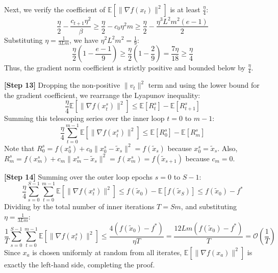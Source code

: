 \documentclass[11pt]{article}
\begin{document}
Next, we verify the coefficient of $\mathbb{E}[\|\nabla f(x_t)\|^2]$ is at least $\frac{\eta}{4}$:
\begin{equation*}
    \frac{\eta}{2} - \frac{c_{t+1}\eta^2}{\beta} \ge \frac{\eta}{2} - c_0 \eta^2 m \ge \frac{\eta}{2} - \frac{\eta^3 L^2 m^2 (e-1)}{2}
\end{equation*}
Substituting $\eta = \frac{1}{3Lm}$, we have $\eta^2 L^2 m^2 = \frac{1}{9}$:
\begin{equation*}
    \frac{\eta}{2} \left( 1 - \frac{e-1}{9} \right) \ge \frac{\eta}{2} \left( 1 - \frac{2}{9} \right) = \frac{7\eta}{18} \ge \frac{\eta}{4}
\end{equation*}
Thus, the gradient norm coefficient is strictly positive and bounded below by $\frac{\eta}{4}$.

\textbf{[Step 13]} Dropping the non-positive $\|v_t\|^2$ term and using the lower bound for the gradient coefficient, we rearrange the Lyapunov inequality:
\begin{equation} \tag{Step 13}
    \frac{\eta}{4} \mathbb{E}[\|\nabla f(x_t^s)\|^2] \le \mathbb{E}[R_t^s] - \mathbb{E}[R_{t+1}^s]
\end{equation}
Summing this telescoping series over the inner loop $t = 0$ to $m-1$:
\begin{equation*}
    \frac{\eta}{4} \sum_{t=0}^{m-1} \mathbb{E}[\|\nabla f(x_t^s)\|^2] \le \mathbb{E}[R_0^s] - \mathbb{E}[R_m^s]
\end{equation*}
Note that $R_0^s = f(x_0^s) + c_0\|x_0^s - \tilde{x}_s\|^2 = f(\tilde{x}_s)$ because $x_0^s = \tilde{x}_s$. Also, $R_m^s = f(x_m^s) + c_m\|x_m^s - \tilde{x}_s\|^2 = f(x_m^s) = f(\tilde{x}_{s+1})$ because $c_m = 0$.

\textbf{[Step 14]} Summing over the outer loop epochs $s = 0$ to $S-1$:
\begin{equation*}
    \frac{\eta}{4} \sum_{s=0}^{S-1} \sum_{t=0}^{m-1} \mathbb{E}[\|\nabla f(x_t^s)\|^2] \le f(\tilde{x}_0) - \mathbb{E}[f(\tilde{x}_S)] \le f(\tilde{x}_0) - f^*
\end{equation*}
Dividing by the total number of inner iterations $T = Sm$, and substituting $\eta = \frac{1}{3Lm}$:
\begin{equation} \tag{Step 14}
    \frac{1}{T} \sum_{s=0}^{S-1} \sum_{t=0}^{m-1} \mathbb{E}[\|\nabla f(x_t^s)\|^2] \le \frac{4(f(\tilde{x}_0) - f^*)}{\eta T} = \frac{12Lm(f(\tilde{x}_0) - f^*)}{T} = \mathcal{O}\left(\frac{1}{T}\right)
\end{equation}
Since $x_a$ is chosen uniformly at random from all iterates, $\mathbb{E}[\|\nabla f(x_a)\|^2]$ is exactly the left-hand side, completing the proof.
\end{document}
